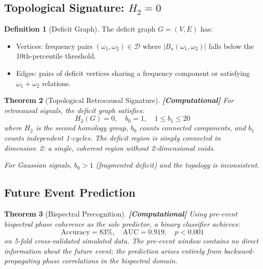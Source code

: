 \documentclass[12pt,a4paper]{article}
\newcommand{\computational}[1]{\textcolor{computational}{\textbf{[Computational]}} #1}
\newtheorem{theorem}{Theorem}[section]
\theoremstyle{definition}
\newtheorem{definition}[theorem]{Definition}
\theoremstyle{remark}
\begin{document}
\subsection{Topological Signature: $H_2 = 0$}

\begin{definition}[Deficit Graph]
\label{def:deficit_graph}
The deficit graph $G = (V, E)$ has:
\begin{itemize}
  \item Vertices: frequency pairs $(\omega_1, \omega_2) \in \mathcal{D}$ where
  $|B_x(\omega_1, \omega_2)|$ falls below the 10th-percentile threshold.
  \item Edges: pairs of deficit vertices sharing a frequency component or
  satisfying $\omega_1 + \omega_2$ relations.
\end{itemize}
\end{definition}

\begin{theorem}[Topological Retrocausal Signature]
\label{thm:topology}
\computational{For retrocausal signals, the deficit graph satisfies:}
\begin{equation}
  H_2(G) = 0, \quad b_0 = 1, \quad 1 \leq b_1 \leq 20
\end{equation}
where $H_2$ is the second homology group, $b_0$ counts connected components,
and $b_1$ counts independent 1-cycles. The deficit region is
\emph{simply connected in dimension~2}: a single, coherent region without
2-dimensional voids.

For Gaussian signals, $b_0 > 1$ (fragmented deficit) and the topology is
inconsistent.
\end{theorem}

\subsection{Future Event Prediction}

\begin{theorem}[Bispectral Precognition]
\label{thm:prediction}
\computational{Using pre-event bispectral phase coherence as the sole
predictor, a binary classifier achieves:}
\begin{equation}
  \text{Accuracy} = 83\%, \quad \text{AUC} = 0.919, \quad p < 0.001
\end{equation}
on 5-fold cross-validated simulated data. The pre-event window contains
\emph{no} direct information about the future event; the prediction arises
entirely from backward-propagating phase correlations in the bispectral domain.
\end{theorem}
\end{document}
